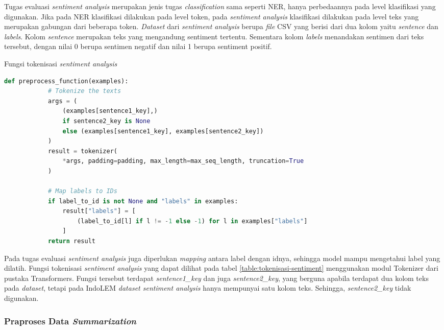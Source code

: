 Tugas evaluasi \textit{sentiment analysis} merupakan jenis tugas \textit{classification} sama seperti NER, hanya perbedaannya pada level klasifikasi yang digunakan. Jika pada NER klasifikasi dilakukan pada level token, pada \textit{sentiment analysis} klasifikasi dilakukan pada level teks yang merupakan gabungan dari beberapa token. \textit{Dataset} dari \textit{sentiment analysis} berupa \textit{file} CSV yang berisi dari dua kolom yaitu \textit{sentence} dan \textit{labels}. Kolom \textit{sentence} merupakan teks yang mengandung sentiment tertentu. Sementara kolom \textit{labels} menandakan sentimen dari teks tersebut, dengan nilai 0 berupa sentimen negatif dan  nilai 1 berupa sentiment positif.

\begin{table}[h]
    \caption{Fungsi tokenisasi \textit{sentiment analysis}}
    \label{table:tokenisasi-sentiment}
    \begin{lstlisting}[language=python]
        def preprocess_function(examples):
            # Tokenize the texts
            args = (
                (examples[sentence1_key],)
                if sentence2_key is None
                else (examples[sentence1_key], examples[sentence2_key])
            )
            result = tokenizer(
                *args, padding=padding, max_length=max_seq_length, truncation=True
            )

            # Map labels to IDs
            if label_to_id is not None and "labels" in examples:
                result["labels"] = [
                    (label_to_id[l] if l != -1 else -1) for l in examples["labels"]
                ]
            return result
    \end{lstlisting}
\end{table}

Pada tugas evaluasi \textit{sentiment analysis} juga diperlukan \textit{mapping} antara label dengan idnya, sehingga model mampu mengetahui label yang dilatih. Fungsi tokenisasi \textit{sentiment analysis} yang dapat dilihat pada tabel \ref{table:tokenisasi-sentiment} menggunakan modul Tokenizer dari pustaka Transformers. Fungsi tersebut terdapat \textit{sentence1\_key} dan juga \textit{sentence2\_key}, yang berguna apabila terdapat dua kolom teks pada \textit{dataset}, tetapi pada IndoLEM \textit{dataset sentiment analysis} hanya mempunyai satu kolom teks. Sehingga, \textit{sentence2\_key} tidak digunakan. 

\subsubsection{Praproses Data \textit{Summarization}}

